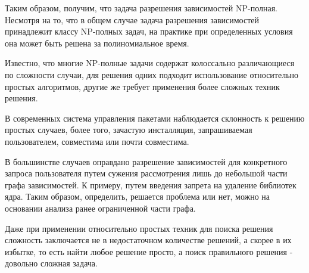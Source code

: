 Таким образом, получим, что задача разрешения зависимостей  NP-полная.\\

Несмотря на то, что в общем случае задача разрешения зависимостей принадлежит
классу NP-полных задач, на практике при определенных условия она может быть
решена за полиномиальное время. 

Известно, что многие NP-полные задачи содержат
колоссально различающиеся по сложности случаи, для решения одних подходит использование относительно простых алгоритмов, другие же требует применения более сложных 
техник решения.

В современных система управления пакетами наблюдается склонность к решению простых
случаев, более того, зачастую инсталляция, запрашиваемая пользователем, совместима или почти совместима. 

В большинстве случаев оправдано разрешение зависимостей для конкретного
запроса пользователя путем сужения рассмотрения лишь до небольшой части графа зависимостей. 
К примеру, путем введения запрета на удаление библиотек ядра. Таким образом, определить,
решается проблема или нет, можно на основании анализа ранее ограниченной части графа.

Даже при применении относительно простых техник для поиска решения сложность заключается
не в недостаточном количестве решений, а скорее в их избытке, то есть найти любое решение
просто, а поиск правильного решения - довольно сложная задача.
 




